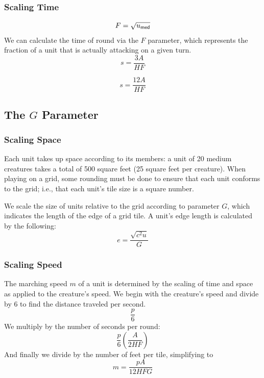 \subsubsection{Scaling Time}

\[
    F = \sqrt{u_{\textsf{med}}}
\]
We can calculate the time of round via the $F$ parameter,
which represents the fraction of a unit that is actually attacking on a given turn.
\[
    s = \frac
        {3 A}
        {H F}
\]

\color{red}
\[
    s = \frac{12 A}{H F}
\]
\color{black}

\subsection{The $G$ Parameter}

\subsubsection{Scaling Space}

Each unit takes up space according to its members:
a unit of 20 medium creatures takes a total of 500 square feet (25 square feet per creature).
When playing on a grid,
some rounding must be done to ensure that each unit conforms to the grid;
i.e., that each unit's tile size is a square number.

We scale the size of units relative to the grid
according to parameter $G$,
which indicates the length of the edge of a grid tile.
A unit's edge length is calculated by the following:
\[
    e = \frac
        {\sqrt{c^2 u}}
        {G}
\]

\subsubsection{Scaling Speed}
The marching speed $m$ of a unit is determined
by the scaling of time and space
as applied to the creature's speed.
We begin with the creature's speed and divide by 6
to find the distance traveled per second.
\[
    \frac
        {p}
        {6}
\]
We multiply by the number of seconds per round:
\[
    \frac
        {p}
        {6}
    \left(
        \frac
            {A}
            {2 H F}
    \right)
\]
And finally we divide by the number of feet per tile,
simplifying to
\[
    m = \frac
        {p A}
        {12 H F G}
\]

